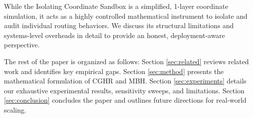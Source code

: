 While the Isolating Coordinate Sandbox is a simplified, 1-layer coordinate simulation, it acts as a highly controlled mathematical instrument to isolate and audit individual routing behaviors. We discuss its structural limitations and systems-level overheads in detail to provide an honest, deployment-aware perspective.

The rest of the paper is organized as follows: Section \ref{sec:related} reviews related work and identifies key empirical gaps. Section \ref{sec:method} presents the mathematical formulation of CGHR and MBH. Section \ref{sec:experiments} details our exhaustive experimental results, sensitivity sweeps, and limitations. Section \ref{sec:conclusion} concludes the paper and outlines future directions for real-world scaling.
